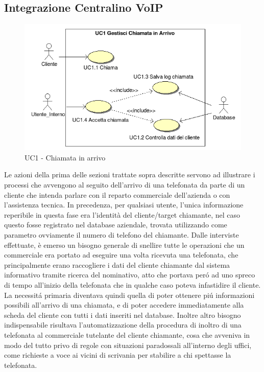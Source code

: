 \subsection{Integrazione Centralino VoIP}
\begin{figure}[!ht]
\centering
 \includegraphics[scale=0.8]{./images/UC1_chiamata.png}
\caption{UC1 - Chiamata in arrivo}
\end{figure}

\noindent
Le azioni della prima delle sezioni trattate sopra descritte servono ad illustrare i processi che avvengono al seguito dell'arrivo di una telefonata da parte di un cliente che intenda parlare con il reparto commerciale dell'azienda o con l'assistenza tecnica. 
In precedenza, per qualsiasi utente, l'unica informazione reperibile in questa fase era l'identit\`a del cliente/target chiamante, nel caso questo fosse registrato nel database aziendale, trovata utilizzando come parametro ovviamente il numero di telefono del chiamante. Dalle interviste effettuate, \`e emerso un bisogno generale di snellire tutte le operazioni che un commerciale era portato ad eseguire una volta ricevuta una telefonata, che principalmente erano raccogliere i dati del cliente chiamante dal sistema informativo tramite ricerca del nominativo, atto che portava per\'o ad uno spreco di tempo all'inizio della telefonata che in qualche caso poteva infastidire il cliente. La necessit\'a primaria diventava quindi quella di poter ottenere pi\'u informazioni possibili all'arrivo di una chiamata, e di poter accedere immediatamente alla scheda del cliente con tutti i dati inseriti nel database. Inoltre altro bisogno indispensabile risultava l'automatizzazione della procedura di inoltro di una telefonata al commerciale tutelante del cliente chiamante, cosa che avveniva in modo del tutto privo di regole con situazioni paradossali all'interno degli uffici, come richieste a voce ai vicini di scrivania per stabilire a chi spettasse la telefonata.
